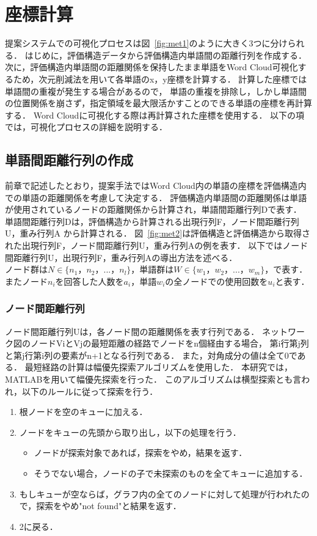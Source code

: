 \documentclass[syuuron]{kuee}
\begin{document}
	\section{座標計算}
		提案システムでの可視化プロセスは図~\ref{fig:met1}のように大きく3つに分けられる．
		はじめに，評価構造データから評価構造内単語間の距離行列を作成する．
		次に，評価構造内単語間の距離関係を保持したまま単語をWord Cloud可視化するため，次元削減法を用いて各単語のx，y座標を計算する．
		計算した座標では単語間の重複が発生する場合があるので，
		単語の重複を排除し，しかし単語間の位置関係を崩さず，指定領域を最大限活かすことのできる単語の座標を再計算する．
		Word Cloudに可視化する際は再計算された座標を使用する．
		以下の項では，可視化プロセスの詳細を説明する．
		
		\subsection{単語間距離行列の作成}
			前章で記述したとおり，提案手法ではWord Cloud内の単語の座標を評価構造内での単語の距離関係を考慮して決定する．
			評価構造内単語間の距離関係は単語が使用されているノードの距離関係から計算され，単語間距離行列Dで表す．
			単語間距離行列Dは，評価構造から計算される出現行列F，ノード間距離行列U，重み行列A から計算される．
			図~\ref{fig:met2}は評価構造と評価構造から取得された出現行列F，ノード間距離行列U，重み行列Aの例を表す．
			以下ではノード間距離行列U，出現行列F，重み行列Aの導出方法を述べる．
			$ノード群はN \in \bigl\{n_{1}，n_{2}，...，n_{l} \bigl\}，単語群はW \in \bigl\{w_{1}，w_{2}，...，w_{m} \bigl\}，で表す．$
			$またノードn_iを回答した人数をa_i，単語w_iの全ノードでの使用回数をu_iと表す．$
			
			\subsubsection{ノード間距離行列}
				ノード間距離行列Uは，各ノード間の距離関係を表す行列である．
				ネットワーク図のノードViとVjの最短距離の経路でノードをn個経由する場合，
				第i行第j列と第j行第i列の要素がn+1となる行列である．
				また，対角成分の値は全て0である．
				最短経路の計算は幅優先探索アルゴリズムを使用した．
				本研究では，MATLABを用いて幅優先探索を行った\cite{int1}．
				このアルゴリズムは横型探索とも言われ，以下のルールに従って探索を行う．
				
				\begin{enumerate}
					\item 根ノードを空のキューに加える．
					\item ノードをキューの先頭から取り出し，以下の処理を行う．
						\begin{itemize}
							\item ノードが探索対象であれば，探索をやめ，結果を返す．
							\item そうでない場合，ノードの子で未探索のものを全てキューに追加する．
						\end{itemize}
					\item もしキューが空ならば，グラフ内の全てのノードに対して処理が行われたので，探索をやめ"not found"と結果を返す．
					\item 2に戻る．
				\end{enumerate}
				
\end{document}
